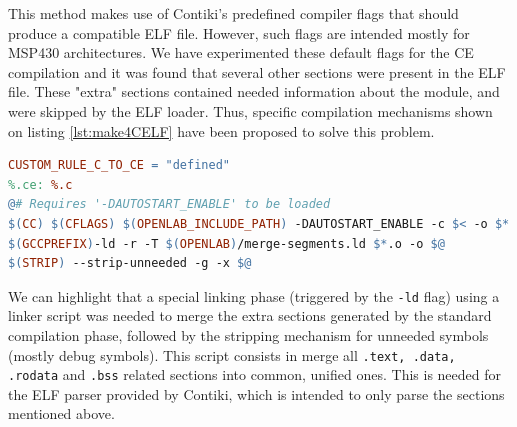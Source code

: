 This method makes use of Contiki's predefined compiler flags that should produce a compatible ELF file.
However, such flags are intended mostly for MSP430 architectures.
We have experimented these default flags for the CE compilation and it was found that several other sections were present in the ELF file.
These "extra" sections contained needed information about the module, and were skipped by the ELF loader.
Thus, specific compilation mechanisms shown on listing \ref{lst:make4CELF} have been proposed to solve this problem.
\\
\begin{lstlisting}[language=make, caption=Compilation instructions to generate an ARM ELF file., label=lst:make4CELF]
CUSTOM_RULE_C_TO_CE = "defined"
%.ce: %.c
@# Requires '-DAUTOSTART_ENABLE' to be loaded
$(CC) $(CFLAGS) $(OPENLAB_INCLUDE_PATH) -DAUTOSTART_ENABLE -c $< -o $*.o
$(GCCPREFIX)-ld -r -T $(OPENLAB)/merge-segments.ld $*.o -o $@
$(STRIP) --strip-unneeded -g -x $@
\end{lstlisting}

We can highlight that a special linking phase (triggered by the \texttt{-ld} flag) using a linker script was needed to merge the extra sections generated by the standard compilation phase, followed by the stripping mechanism for unneeded symbols (mostly debug symbols).
This script consists in merge all \texttt{.text, .data, .rodata} and \texttt{.bss} related sections into common, unified ones.
This is needed for the ELF parser provided by Contiki, which is intended to only parse the sections mentioned above.




